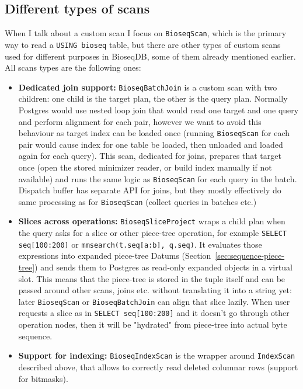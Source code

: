 \subsection{Different types of scans}

When I talk about a custom scan I focus on \texttt{BioseqScan}, which is the primary way to read a \texttt{USING bioseq} table, but there are other types of custom scans used for different purposes in BioseqDB, some of them already mentioned earlier.
All scans types are the following ones:
\begin{itemize}
  \item \textbf{Dedicated join support:}
    \texttt{BioseqBatchJoin} is a custom scan with two children: one child is the target plan, the other is the query plan.
    Normally Postgres would use nested loop join that would read one target and one query and perform alignment for each pair, however we want to avoid this behaviour as target index can be loaded once (running \texttt{BioseqScan} for each pair would cause index for one table be loaded, then unloaded and loaded again for each query).
    This scan, dedicated for joins, prepares that target once (open the stored minimizer reader, or build index manually if not available) and runs the same logic as \texttt{BioseqScan} for each query in the batch.
    Dispatch buffer has separate API for joins, but they mostly effectively do same processing as for \texttt{BioseqScan} (collect queries in batches etc.)
  \item \textbf{Slices across operations:}
    \texttt{BioseqSliceProject} wraps a child plan when the query asks for a slice or other piece-tree operation, for example \texttt{SELECT seq[100:200]} or \texttt{mmsearch(t.seq[a:b], q.seq)}.
    It evaluates those expressions into expanded piece-tree Datums (Section~\ref{sec:sequence-piece-tree}) and sends them to Postgres as read-only expanded objects in a virtual slot. This means that the piece-tree is stored in the tuple itself and can be passed around other scans, joins etc. without translating it into a string yet:
    later \texttt{BioseqScan} or \texttt{BioseqBatchJoin} can align that slice lazily.
    When user requests a slice as in \texttt{SELECT seq[100:200]} and it doesn't go through other operation nodes, then it will be "hydrated" from piece-tree into actual byte sequence.
  \item \textbf{Support for indexing:}
    \texttt{BioseqIndexScan} is the wrapper around \texttt{IndexScan} described above, that allows to correctly read deleted columnar rows (support for bitmasks).

\end{itemize}
